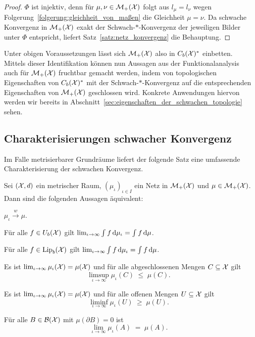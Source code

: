 \documentclass[../main/main.tex]{subfiles}
\begin{document}
	\begin{proof}
		$\Phi$ ist injektiv, denn für $\mu, \nu \in \mathcal{M}_{+}(\mathcal{X})$ folgt aus $l_\mu = l_\nu$ wegen Folgerung~\ref{folgerung:gleichheit_von_maßen} die Gleichheit $\mu = \nu$. 
		Da schwache Konvergenz in $\mathcal{M}_{+}(\mathcal{X})$ exakt der Schwach-$\ast$-Konvergenz der jeweiligen Bilder unter $\Phi$ entspricht, liefert Satz~\ref{satz:netz_konvergenz}
		die Behauptung.
	\end{proof}

	Unter obigen Voraussetzungen lässt sich $\mathcal{M}_{+}(\mathcal{X})$ also in $C_b(\mathcal{X})^\ast$ einbetten. Mittels dieser Identifikation können nun Aussagen aus der 
	Funktionalanalysis auch für $\mathcal{M}_{+}(\mathcal{X})$ fruchtbar gemacht werden, indem von topologischen Eigenschaften von
	$C_b(\mathcal{X})^\ast$ mit der Schwach-$\ast$-Konvergenz auf die entsprechenden Eigenschaften von 
	$\mathcal{M}_{+}(\mathcal{X})$ geschlossen wird. Konkrete Anwendungen hiervon werden wir bereits in Abschnitt~\ref{sec:eigenschaften_der_schwachen_topologie} sehen.
	
	\subsection{Charakterisierungen schwacher Konvergenz}
	\label{subsec:charakterisierung_schwache_konvergenz}
	
	Im Falle metrisierbarer Grundräume liefert der folgende Satz eine umfassende Charakterisierung der schwachen Konvergenz.
	
	\begin{Satz}[Portmanteau]
		\label{satz:portmanteau}
		Sei $(\mathcal{X}, d)$ ein metrischer Raum, $(\mu_\iota)_{\iota \in I}$ ein Netz in $\mathcal{M}_{+}(\mathcal{X})$
		und $\mu \in \mathcal{M}_{+}(\mathcal{X})$. Dann sind die folgenden Aussagen äquivalent:
		\begin{equivalentthm}
			\item $\mu_\iota \xrightarrow{w} \mu$.
			\item Für alle $f \in U_b(\mathcal{X})$ gilt $\lim_{\iota \to \infty} \int_{} \, f \, \mathrm{d}\mu_\iota = \int_{} \, f \, \mathrm{d}\mu$.
			\item Für alle $f \in \mathrm{Lip}_b(\mathcal{X})$ gilt $\lim_{\iota \to \infty} \int_{} \, f \, \mathrm{d}\mu_\iota = \int_{} \, f \, \mathrm{d}\mu$.
			\item Es ist 
			$\lim_{\iota \to \infty} \mu_\iota(\mathcal{X}) = \mu(\mathcal{X})$
			und für alle abgeschlossenen Mengen $C \subseteq \mathcal{X}$ gilt 
			$$\limsup_{\iota \to \infty} \mu_\iota(C) \; \leq \; \mu(C) \text{.}$$
			\item Es ist 
			$\lim_{\iota \to \infty} \mu_\iota(\mathcal{X}) = \mu(\mathcal{X})$
			und für alle offenen Mengen $U \subseteq \mathcal{X}$ gilt 
			$$\liminf_{\iota \to \infty} \mu_\iota(U) \; \geq \; \mu(U) \text{.}$$
			\item Für alle $B \in \mathcal{B}(\mathcal{X})$ mit $\mu(\partial B) = 0$ 
			ist $$\lim_{\iota \to \infty} \mu_\iota(A) \; = \; \mu(A) \text{.}$$
		\end{equivalentthm}
	\end{Satz}
	
\end{document}
